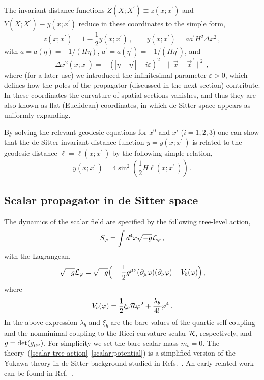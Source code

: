 \documentclass[aps,12pt,superscriptaddress,preprintnumbers,
                secnumarabic,nofootinbib,showpacs]{revtex4}
\begin{document}
The invariant distance functions $Z(X;X^\prime) \equiv
z(x;x^\prime)$ and $Y(X;X^\prime) \equiv y(x;x^\prime)$ reduce in
these coordinates to the simple form,
\begin{equation}
 z(x;x^\prime) = 1 - \frac 12 y(x;x^\prime)
\,,\qquad
 y(x;x^\prime) = aa^\prime H^2 \Delta x^2\,,
\label{invariant distance:2}
\end{equation}
with $a = a(\eta) = -1/(H\eta)$,
$a^\prime = a(\eta^\prime) = -1/(H\eta^\prime)$, and
\begin{equation}
\Delta x^2(x;x^\prime) = -(|\eta-\eta^\prime|-i\varepsilon)^2
                + \|\vec x-\vec x^{\,\prime}\|^2
\,,
\label{Delta x}
\end{equation}
where (for a later use)  we introduced the infinitesimal parameter
$\varepsilon>0$, which defines how the poles of the propagator
(discussed in the next section) contribute.
In these coordinates the curvature of spatial sections vanishes,
and thus they are also known as flat (Euclidean) coordinates, in which
de Sitter space appears as uniformly expanding.

 By solving the relevant geodesic equations for $x^0$ and $x^i$ ($i=1,2,3$)
one can show that the de Sitter invariant distance function
$y=y(x;x^\prime\,)$ is related to
the geodesic distance $\ell=\ell(x;x^\prime\,)$ by the following simple
relation,
\begin{equation}
 y(x;x^\prime\,) = 4 \sin^2\left(\frac12 H\ell(x;x^\prime\,)\right)
\,.
\label{geodesic distance}
\end{equation}

\subsection{Scalar propagator in de Sitter space}
\label{Scalar propagator in de Sitter space}

The dynamics of the scalar field are specified by the following
tree-level action,
\begin{eqnarray}
 S_\varphi = \int d^4 x \sqrt{-g} {\cal L}_\varphi
\,,
\label{scalar tree action}
\end{eqnarray}
with the Lagrangean,
\begin{eqnarray}
\sqrt{-g} {\cal L}_\varphi =
 \sqrt{-g}
   \Big(
   - \frac12 g^{\mu\nu}(\partial_\mu\varphi)(\partial_\nu\varphi)
   - V_b(\varphi)
 \Big)
\,,
\label{scalar lagrangean}
\end{eqnarray}
where
\begin{equation}
 V_b(\varphi) = \frac12 \xi_b {\cal
 R}\varphi^2 + \frac{\lambda_b}{4!} \varphi^4 \,.
\label{scalar:potential}
\end{equation}
In the above expression $\lambda_b$ and $\xi_b$ are the bare values of
the quartic self-coupling and the nonminimal coupling
to the Ricci curvature scalar ${\cal R}$, respectively, and
$g={\rm det}(g_{\mu\nu})$. For simplicity we set the bare scalar mass
$m_b=0$. The theory~(\ref{scalar tree action}--\ref{scalar:potential})
is a simplified version of the Yukawa theory in de Sitter background
studied in Refs.~\cite{Prokopec:2006,MiaoWoodard:2006}.
An early related work can be found in Ref.~\cite{CandelasRaine:1975}.
\end{document}
